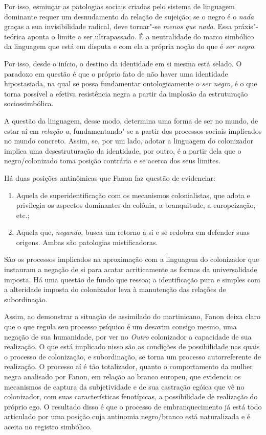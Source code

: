 Por isso, esmiuçar as patologias sociais criadas pelo sistema de
linguagem dominante requer um desnudamento da relação de sujeição; se o
negro é o \emph{nada} graças a sua invisibilidade radical, deve
tornar"-se \emph{menos que nada}. Essa práxis"-teórica aponta o limite a
ser ultrapassado. É a neutralidade do marco simbólico da linguagem que
está em disputa e com ela a própria noção do que é \emph{ser negro}.

Por isso, desde o início, o destino da identidade em si mesma está
selado. O paradoxo em questão é que o próprio fato de não haver uma
identidade hipostasiada, na qual se possa fundamentar ontologicamente o
\emph{ser negro}, é o que torna possível a efetiva resistência negra a
partir da implosão da estruturação sociossimbólica.

A questão da linguagem, desse modo, determina uma forma de ser no mundo,
de estar aí em \emph{relação a}, fundamentando"-se a partir dos processos
sociais implicados no mundo concreto. Assim, se, por um lado, adotar a
linguagem do colonizador implica uma desestruturação da identidade, por
outro, é a partir dela que o negro/colonizado toma posição contrária e
se acerca dos seus limites.

Há duas posições antinômicas que Fanon faz questão de evidenciar:

\begin{enumerate}[label=\alph*)]
\item
Aquela de superidentificação com os mecanismos colonialistas,
que adota e privilegia os aspectos dominantes da colônia, a branquitude,
a europeização, etc.; 
\item
Aquela que, \emph{negando}, busca um retorno a si e se redobra em defender suas origens. Ambas são patologias mistificadoras.
\end{enumerate}

São os processos implicados na aproximação com a linguagem do
colonizador que instauram a negação de si para acatar acriticamente as
formas da universalidade imposta. Há uma questão de fundo que ressoa; a
identificação pura e simples com a alteridade imposta do colonizador
leva à manutenção das relações de subordinação.

Assim, ao demonstrar a situação de assimilado do martinicano, Fanon
deixa claro que o que regula seu processo psíquico é um desavim consigo
mesmo, uma negação de sua humanidade, por ver no \emph{Outro}
colonizador a capacidade de sua realização. O que está implicado nisso
são as condições de possibilidade nas quais o processo de colonização, e
subordinação, se torna um processo autorreferente de realização. O
processo aí é tão totalizador, quanto o comportamento da mulher negra
analisado por Fanon, em relação ao branco europeu, que evidencia os
mecanismos de captura da subjetividade e de sua castração egóica que vê
no colonizador, com suas características fenotípicas, a possibilidade de
realização do próprio ego. O resultado disso é que o processo de
embranquecimento já está todo articulado por uma posição cuja antinomia
negro/branco está naturalizada e é aceita no registro simbólico.

